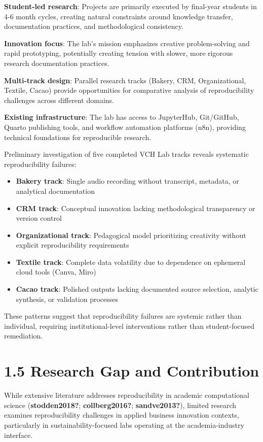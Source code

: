 \documentclass[
  oneside,
  open=any]{scrbook}
\providecommand{\tightlist}{%
  \setlength{\itemsep}{0pt}\setlength{\parskip}{0pt}}\usepackage{longtable,booktabs,array}
\begin{document}
\textbf{Student-led research}: Projects are primarily executed by
final-year students in 4-6 month cycles, creating natural constraints
around knowledge transfer, documentation practices, and methodological
consistency.

\textbf{Innovation focus}: The lab's mission emphasizes creative
problem-solving and rapid prototyping, potentially creating tension with
slower, more rigorous research documentation practices.

\textbf{Multi-track design}: Parallel research tracks (Bakery, CRM,
Organizational, Textile, Cacao) provide opportunities for comparative
analysis of reproducibility challenges across different domains.

\textbf{Existing infrastructure}: The lab has access to JupyterHub,
Git/GitHub, Quarto publishing tools, and workflow automation platforms
(n8n), providing technical foundations for reproducible research.

Preliminary investigation of five completed VCH Lab tracks reveals
systematic reproducibility failures:

\begin{itemize}
\tightlist
\item
  \textbf{Bakery track}: Single audio recording without transcript,
  metadata, or analytical documentation
\item
  \textbf{CRM track}: Conceptual innovation lacking methodological
  transparency or version control
\item
  \textbf{Organizational track}: Pedagogical model prioritizing
  creativity without explicit reproducibility requirements
\item
  \textbf{Textile track}: Complete data volatility due to dependence on
  ephemeral cloud tools (Canva, Miro)
\item
  \textbf{Cacao track}: Polished outputs lacking documented source
  selection, analytic synthesis, or validation processes
\end{itemize}

These patterns suggest that reproducibility failures are systemic rather
than individual, requiring institutional-level interventions rather than
student-focused remediation.

\section{1.5 Research Gap and
Contribution}\label{research-gap-and-contribution}

While extensive literature addresses reproducibility in academic
computational science (\textbf{stodden2018?}; \textbf{collberg2016?};
\textbf{sandve2013?}), limited research examines reproducibility
challenges in applied business innovation contexts, particularly in
sustainability-focused labs operating at the academia-industry
interface.
\end{document}
